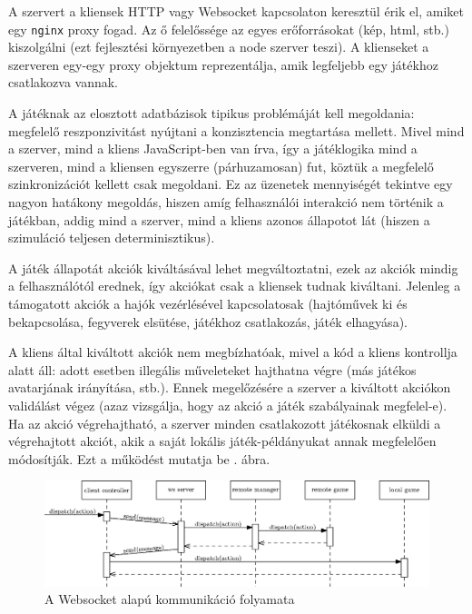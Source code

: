 \documentclass[12pt]{article}
\begin{document}
A szervert a kliensek HTTP vagy Websocket kapcsolaton keresztül érik el, amiket
egy \texttt{nginx} proxy fogad. Az ő felelőssége az egyes erőforrásokat (kép, html, stb.)
kiszolgálni (ezt fejlesztési környezetben a node szerver teszi).
A klienseket a szerveren egy-egy proxy objektum reprezentálja, amik legfeljebb
egy játékhoz csatlakozva vannak.

A játéknak az elosztott adatbázisok tipikus problémáját kell megoldania:
megfelelő reszponzivitást nyújtani a konzisztencia megtartása mellett.
Mivel mind a szerver, mind a kliens JavaScript-ben van írva, így a játéklogika
mind a szerveren, mind a kliensen egyszerre (párhuzamosan) fut,
köztük a megfelelő szinkronizációt kellett csak megoldani.
Ez az üzenetek mennyiségét tekintve egy nagyon hatákony megoldás, hiszen amíg
felhasználói interakció nem történik a játékban, addig mind a szerver, mind a
kliens azonos állapotot lát (hiszen a szimuláció teljesen determinisztikus).

A játék állapotát akciók kiváltásával lehet megváltoztatni, ezek az akciók
mindig a felhasználótól erednek, így akciókat csak a kliensek tudnak kiváltani.
Jelenleg a támogatott akciók a hajók vezérlésével kapcsolatosak (hajtóművek ki
és bekapcsolása, fegyverek elsütése, játékhoz csatlakozás, játék elhagyása).

A kliens által kiváltott akciók nem megbízhatóak, mivel a kód a kliens kontrollja alatt áll:
adott esetben illegális műveleteket hajthatna végre (más játékos avatarjának irányítása, stb.).
Ennek megelőzésére a szerver a kiváltott akciókon validálást végez (azaz vizsgálja,
hogy az akció a játék szabályainak megfelel-e).
Ha az akció végrehajtható, a szerver minden csatlakozott játékosnak elküldi
a végrehajtott akciót, akik a saját lokális játék-példányukat annak megfelelően módosítják.
Ezt a működést mutatja be . ábra.

\begin{figure}[h!]
  \centering
  \includegraphics[width=\textwidth]{figures/ws}
  \caption{A Websocket alapú kommunikáció folyamata}
  \label{fig:ws-arch}
\end{figure}
\end{document}
